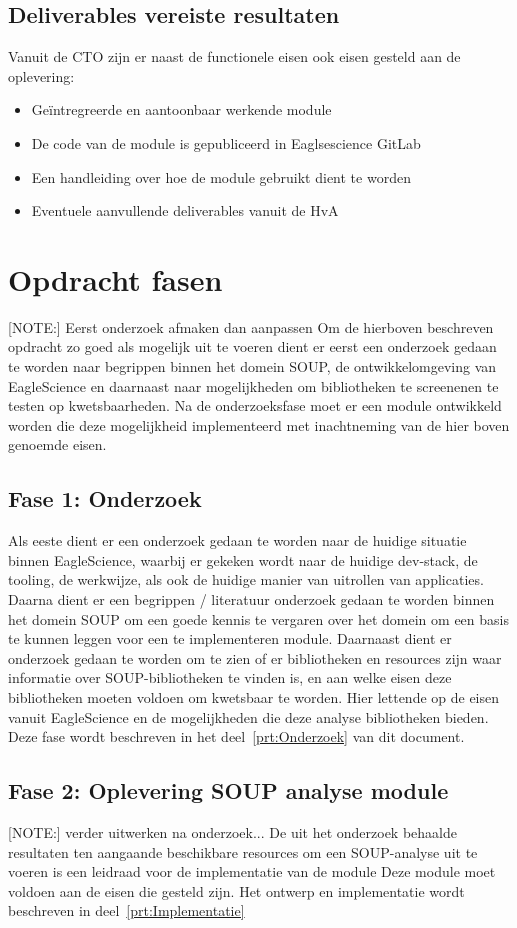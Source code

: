 \subsection{Deliverables vereiste resultaten}\label{subsec:deliverables-vereiste-resultaten}
Vanuit de CTO zijn er naast de functionele eisen ook eisen gesteld aan de oplevering:
\begin{itemize}
\item Geïntregreerde en aantoonbaar werkende module
\item De code van de module is gepubliceerd in Eaglsescience GitLab
\item Een handleiding over hoe de module gebruikt dient te worden
\item Eventuele aanvullende deliverables vanuit de HvA
\end{itemize}

\section{Opdracht fasen}\label{sec:opdracht-fasen}
[NOTE:] Eerst onderzoek afmaken dan aanpassen
Om de hierboven beschreven opdracht zo goed als mogelijk uit te voeren dient er eerst een onderzoek gedaan te worden naar begrippen binnen het domein SOUP, de ontwikkelomgeving van EagleScience en daarnaast naar mogelijkheden om bibliotheken te screenenen te testen op kwetsbaarheden. Na de onderzoeksfase moet er een module ontwikkeld worden die deze mogelijkheid implementeerd met inachtneming van de  hier boven genoemde eisen.

\subsection{Fase 1: Onderzoek} \label{subsec:fase-1:-onderzoek}
Als eeste dient er een onderzoek gedaan te worden naar de huidige situatie binnen EagleScience, waarbij er gekeken wordt naar de huidige dev-stack, de tooling, de werkwijze, als ook de huidige manier van uitrollen van applicaties. Daarna dient er een begrippen / literatuur onderzoek gedaan te worden binnen het domein SOUP om een goede kennis te vergaren over het domein om een basis te kunnen leggen voor een te implementeren module. Daarnaast dient er onderzoek gedaan te worden om te zien of er bibliotheken en resources zijn waar informatie over SOUP-bibliotheken te vinden is, en aan welke eisen deze bibliotheken moeten voldoen om kwetsbaar te worden. Hier lettende op de eisen vanuit EagleScience en de mogelijkheden die deze analyse bibliotheken bieden. Deze fase wordt beschreven in het deel~\ref{prt:Onderzoek} van dit document.

\subsection{Fase 2: Oplevering SOUP analyse module}\label{subsec:fase-2:-oplevering-soup-analyse-module}
[NOTE:] verder uitwerken na onderzoek...
De uit het onderzoek behaalde resultaten ten aangaande beschikbare resources om een SOUP-analyse uit te voeren is een leidraad voor de implementatie van de module Deze module moet voldoen aan de eisen die gesteld zijn. Het ontwerp en implementatie wordt beschreven in deel~\ref{prt:Implementatie}
